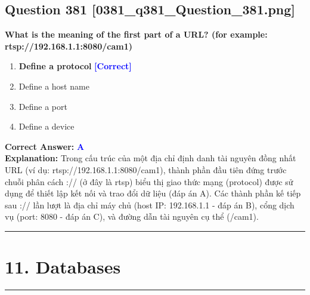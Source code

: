 \documentclass[11pt,a4paper]{article}
\begin{document}
\begin{minipage}{\textwidth}
\subsection*{Question 381 \quad \footnotesize{[0381\_q381\_Question\_381.png]}}
\noindent \textbf{What is the meaning of the first part of a URL? (for example: rtsp://192.168.1.1:8080/cam1)}

\begin{enumerate}[label=\Alph*.]
    \item \textbf{Define a protocol} \hfill \textcolor{blue}{\textbf{[Correct]}}
    \item Define a host name
    \item Define a port
    \item Define a device
\end{enumerate}

\noindent \textbf{Correct Answer:} \textcolor{blue}{\textbf{A}} \\[2pt]
\noindent \textbf{Explanation:} Trong cấu trúc của một địa chỉ định danh tài nguyên đồng nhất URL (ví dụ: rtsp://192.168.1.1:8080/cam1), thành phần đầu tiên đứng trước chuỗi phân cách :// (ở đây là rtsp) biểu thị giao thức mạng (protocol) được sử dụng để thiết lập kết nối và trao đổi dữ liệu (đáp án A). Các thành phần kế tiếp sau :// lần lượt là địa chỉ máy chủ (host IP: 192.168.1.1 - đáp án B), cổng dịch vụ (port: 8080 - đáp án C), và đường dẫn tài nguyên cụ thể (/cam1).

\par\vspace{0.3cm}
\hrule
\vspace{0.3cm}
\end{minipage}


\newpage
\section*{11. Databases}
\hrule\vspace{0.5cm}
\end{document}
